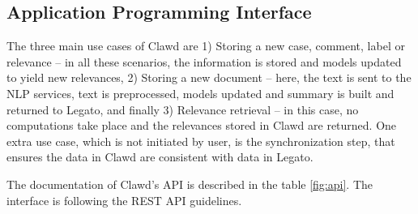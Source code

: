 \documentclass[
  digital, %
  notable,   %
  nolof,     %
  nolot,     %
  draft
]{fithesis3}
\begin{document}
\subsection{Application Programming Interface}
\label{sec:api}
The three main use cases of Clawd are 1) Storing a new case, comment, label or relevance -- in all these scenarios, the information is stored and models updated to yield new relevances, 2) Storing a new document -- here, the text is sent to the NLP services, text is preprocessed, models updated and summary is built and returned to Legato, and finally 3) Relevance retrieval -- in this case, no computations take place and the relevances stored in Clawd are returned.
One extra use case, which is not initiated by user, is the synchronization step, that ensures the data in Clawd are consistent with data in Legato.

The documentation of Clawd's API is described in the table \ref{fig:api}.
The interface is following the REST API guidelines.
\end{document}
